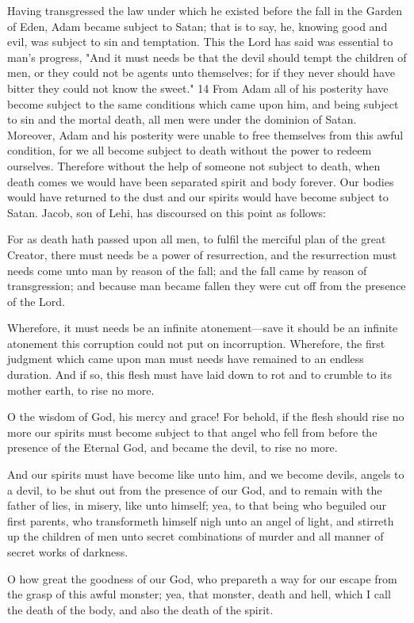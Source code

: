 Having transgressed the law under which he existed before the fall in the Garden of Eden,
Adam became subject to Satan; that is to say, he, knowing good and evil, was subject to sin
and temptation. This the Lord has said was essential to man's progress, "And it must needs be
that the devil should tempt the children of men, or they could not be agents unto themselves;
for if they never should have bitter they could not know the sweet." 14 From Adam all of his
posterity have become subject to the same conditions which came upon him, and being
subject to sin and the mortal death, all men were under the dominion of Satan. Moreover,
Adam and his posterity were unable to free themselves from this awful condition, for we all
become subject to death without the power to redeem ourselves. Therefore without the help
of someone not subject to death, when death comes we would have been separated spirit and
body forever. Our bodies would have returned to the dust and our spirits would have become
subject to Satan. Jacob, son of Lehi, has discoursed on this point as follows:

For as death hath passed upon all men, to fulfil the merciful plan of the great Creator, there
must needs be a power of resurrection, and the resurrection must needs come unto man by
reason of the fall; and the fall came by reason of transgression; and because man became
fallen they were cut off from the presence of the Lord.

Wherefore, it must needs be an infinite atonement—save it should be an infinite atonement
this corruption could not put on incorruption. Wherefore, the first judgment which came
upon man must needs have remained to an endless duration. And if so, this flesh must have
laid down to rot and to crumble to its mother earth, to rise no more.

O the wisdom of God, his mercy and grace! For behold, if the flesh should rise no more our
spirits must become subject to that angel who fell from before the presence of the Eternal
God, and became the devil, to rise no more.

And our spirits must have become like unto him, and we become devils, angels to a devil, to
be shut out from the presence of our God, and to remain with the father of lies, in misery, like
unto himself; yea, to that being who beguiled our first parents, who transformeth himself
nigh unto an angel of light, and stirreth up the children of men unto secret combinations of
murder and all manner of secret works of darkness.

O how great the goodness of our God, who prepareth a way for our escape from the grasp of
this awful monster; yea, that monster, death and hell, which I call the death of the body, and
also the death of the spirit.

